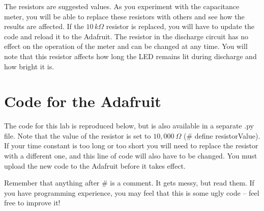 \documentclass[]{article}
\begin{document}
The resistors are suggested values.  As you experiment with the capacitance meter, you will be able to replace these resistors with others and see how the results are affected.  If the $10\,k \Omega$ resistor is replaced, you will have to update the code and reload it to the Adafruit.  The resistor in the discharge circuit has no effect on the operation of the meter and can be changed at any time.  You will note that this resistor affects how long the LED remains lit during discharge and how bright it is.

\section{Code for the Adafruit}

The code for this  lab is reproduced below, but is also available in a separate .py file.  Note that the value of the  resistor is set to $10,000\ \Omega$  (\# define resistorValue).  If your time constant is too long or too short you will need to replace the resistor with a different one, and this line of code will also have to be changed.  You must upload the new code to the Adafruit before it takes effect.

Remember that anything after \# is a comment.  It gets messy, but read them.  If you have programming experience, you may feel that this is some ugly code -- feel free to improve it!
\end{document}
